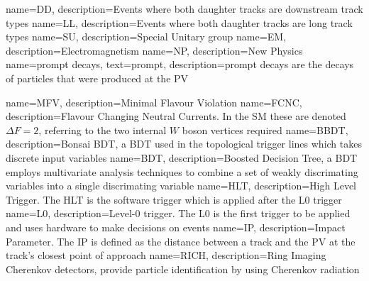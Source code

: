                  {
                   name=DD,
                   description={Events where both daughter tracks are downstream track types}
                 }
                 {
                   name=LL,
                   description={Events where both daughter tracks are long track types}
                 }
                 {
                   name=SU,
                   description={Special Unitary group}
                 }                 
                 {
                   name=EM,
                   description={Electromagnetism}
                 }                 
                 {
                   name=NP,
                   description={New Physics}
                 }
                 {
                   name=prompt decays,
                   text=prompt,
                   description={prompt decays are the decays of particles that were produced at the \Gls{PV}}
                 }
                 
                 {
                   name=MFV,
                   description={Minimal Flavour Violation}
                 }
                 {
                   name=FCNC,
                   description={Flavour Changing Neutral Currents. In the \Gls{SM} these are denoted $\Delta F = 2$, referring to the two internal $W$ boson vertices required}}
                 {
                   name=BBDT,
                   description={Bonsai BDT, a BDT used in the topological trigger lines which takes discrete input variables}}
                 {
                   name=BDT,
                   description={Boosted Decision Tree, a BDT employs multivariate analysis techniques to combine a set of weakly discrimating variables into a single discrimating variable}}                   
                 {
                   name=HLT,
                   description={High Level Trigger. The HLT is the software trigger which is applied after the \Gls{L0} trigger}}
                 {
                   name=L0,
                   description={Level-0 trigger. The L0 is the first trigger to be applied and uses hardware to make decisions on events  }}                   
                 {
                   name=IP,
                   description={Impact Parameter. The IP is defined as the distance between a track and the \Gls{PV} at the track's closest point of approach }}                                                                        
                 {
                   name=RICH,
                   description={Ring Imaging Cherenkov detectors, provide particle identification by using Cherenkov radiation}                         
                 }

